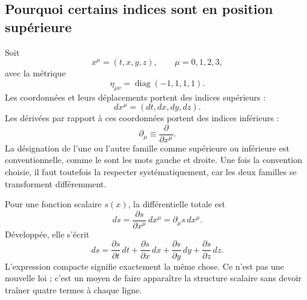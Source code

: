 \subsection{Pourquoi certains indices sont en position supérieure}

Soit
\begin{equation}
x^\mu=(t,x,y,z),
\qquad
\mu=0,1,2,3,
\end{equation}
avec la métrique
\begin{equation}
\eta_{\mu\nu}
=
\operatorname{diag}(-1,1,1,1).
\label{eq:sr7-metric}
\end{equation}
Les coordonnées et leurs déplacements portent des indices supérieurs :
\begin{equation}
dx^\mu=(dt,dx,dy,dz).
\end{equation}
Les dérivées par rapport à ces coordonnées portent des indices inférieurs :
\begin{equation}
\partial_\mu
\equiv
\frac{\partial}{\partial x^\mu}.
\label{eq:sr7-gradient}
\end{equation}
La désignation de l’une ou l’autre famille comme supérieure ou inférieure est conventionnelle, comme le sont les mots gauche et droite. Une fois la convention choisie, il faut toutefois la respecter systématiquement, car les deux familles se transforment différemment.

\begin{classroomqa}
\end{classroomqa}

Pour une fonction scalaire \(s(x)\), la différentielle totale est
\begin{equation}
ds
=
\frac{\partial s}{\partial x^\mu}\,dx^\mu
=
\partial_\mu s\,dx^\mu.
\label{eq:sr7-total-differential}
\end{equation}
Développée, elle s’écrit
\begin{equation}
ds
=
\frac{\partial s}{\partial t}\,dt
+\frac{\partial s}{\partial x}\,dx
+\frac{\partial s}{\partial y}\,dy
+\frac{\partial s}{\partial z}\,dz.
\end{equation}
L’expression compacte signifie exactement la même chose. Ce n’est pas une nouvelle loi ; c’est un moyen de faire apparaître la structure scalaire sans devoir traîner quatre termes à chaque ligne.


